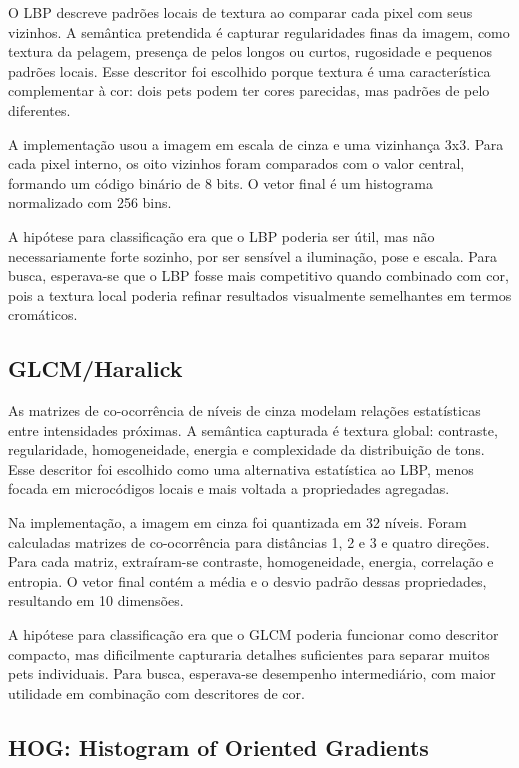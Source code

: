 \documentclass[12pt,a4paper]{article}
\begin{document}
O LBP descreve padrões locais de textura ao comparar cada pixel com seus vizinhos. A semântica pretendida é capturar regularidades finas da imagem, como textura da pelagem, presença de pelos longos ou curtos, rugosidade e pequenos padrões locais. Esse descritor foi escolhido porque textura é uma característica complementar à cor: dois pets podem ter cores parecidas, mas padrões de pelo diferentes.

A implementação usou a imagem em escala de cinza e uma vizinhança 3x3. Para cada pixel interno, os oito vizinhos foram comparados com o valor central, formando um código binário de 8 bits. O vetor final é um histograma normalizado com 256 bins.

A hipótese para classificação era que o LBP poderia ser útil, mas não necessariamente forte sozinho, por ser sensível a iluminação, pose e escala. Para busca, esperava-se que o LBP fosse mais competitivo quando combinado com cor, pois a textura local poderia refinar resultados visualmente semelhantes em termos cromáticos.

\subsection{GLCM/Haralick}

As matrizes de co-ocorrência de níveis de cinza modelam relações estatísticas entre intensidades próximas. A semântica capturada é textura global: contraste, regularidade, homogeneidade, energia e complexidade da distribuição de tons. Esse descritor foi escolhido como uma alternativa estatística ao LBP, menos focada em microcódigos locais e mais voltada a propriedades agregadas.

Na implementação, a imagem em cinza foi quantizada em 32 níveis. Foram calculadas matrizes de co-ocorrência para distâncias 1, 2 e 3 e quatro direções. Para cada matriz, extraíram-se contraste, homogeneidade, energia, correlação e entropia. O vetor final contém a média e o desvio padrão dessas propriedades, resultando em 10 dimensões.

A hipótese para classificação era que o GLCM poderia funcionar como descritor compacto, mas dificilmente capturaria detalhes suficientes para separar muitos pets individuais. Para busca, esperava-se desempenho intermediário, com maior utilidade em combinação com descritores de cor.

\subsection{HOG: Histogram of Oriented Gradients}
\end{document}
